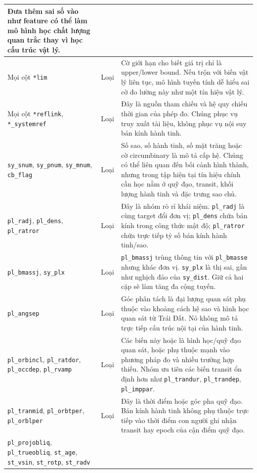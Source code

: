 {\begin{longtable}{@{}p{}p{}p{}@{}}
Đưa thêm sai số vào như feature có thể làm mô hình học chất lượng quan trắc thay vì học cấu trúc
vật lý. \\
\hline
Mọi cột \texttt{*lim}
& Loại
& Cờ giới hạn cho biết giá trị chỉ là upper/lower bound. Nếu trộn với biến vật lý liên tục, mô hình
tuyến tính dễ hiểu sai cờ đo lường này như một tín hiệu vật lý. \\
\hline
Mọi cột \texttt{*reflink}, \texttt{*\_systemref}
& Loại
& Đây là nguồn tham chiếu và hệ quy chiếu thời gian của phép đo. Chúng phục vụ truy xuất tài liệu,
không phục vụ nội suy bán kính hành tinh. \\
\hline
\texttt{sy\_snum}, \texttt{sy\_pnum}, \texttt{sy\_mnum}, \texttt{cb\_flag}
& Loại
& Số sao, số hành tinh, số mặt trăng hoặc cờ circumbinary là mô tả cấp hệ. Chúng có thể liên quan
đến bối cảnh hình thành, nhưng trong tập hiện tại tín hiệu chính cần học nằm ở quỹ đạo, transit,
khối lượng hành tinh và đặc trưng sao chủ. \\
\hline
\texttt{pl\_radj}, \texttt{pl\_dens}, \texttt{pl\_ratror}
& Loại
& Đây là nhóm rò rỉ khái niệm. \texttt{pl\_radj} là cùng target đổi đơn vị;
\texttt{pl\_dens} chứa bán kính trong công thức mật độ; \texttt{pl\_ratror} chứa trực tiếp tỷ số
bán kính hành tinh/sao. \\
\hline
\texttt{pl\_bmassj}, \texttt{sy\_plx}
& Loại
& \texttt{pl\_bmassj} trùng thông tin với \texttt{pl\_bmasse} nhưng khác đơn vị. \texttt{sy\_plx}
là thị sai, gần như nghịch đảo của \texttt{sy\_dist}. Giữ cả hai cặp sẽ làm tăng đa cộng tuyến. \\
\hline
\texttt{pl\_angsep}
& Loại
& Góc phân tách là đại lượng quan sát phụ thuộc vào khoảng cách hệ sao và hình học quan sát từ Trái
Đất. Nó không mô tả trực tiếp cấu trúc nội tại của hành tinh. \\
\hline
\texttt{pl\_orbincl}, \texttt{pl\_ratdor}, \texttt{pl\_occdep}, \texttt{pl\_rvamp}
& Loại
& Các biến này hoặc là hình học/quỹ đạo quan sát, hoặc phụ thuộc mạnh vào phương pháp đo và nhiều
trường hợp thiếu. Nhóm ưu tiên các biến transit ổn định hơn như \texttt{pl\_trandur},
\texttt{pl\_trandep}, \texttt{pl\_imppar}. \\
\hline
\texttt{pl\_tranmid}, \texttt{pl\_orbtper}, \texttt{pl\_orblper}
& Loại
& Đây là thời điểm hoặc góc pha quỹ đạo. Bán kính hành tinh không phụ thuộc trực tiếp vào thời điểm
con người ghi nhận transit hay epoch của cận điểm quỹ đạo. \\
\hline
\texttt{pl\_projobliq}, \texttt{pl\_trueobliq}, \texttt{st\_age}, \texttt{st\_vsin},
\texttt{st\_rotp}, \texttt{st\_radv}

\end{longtable}}
